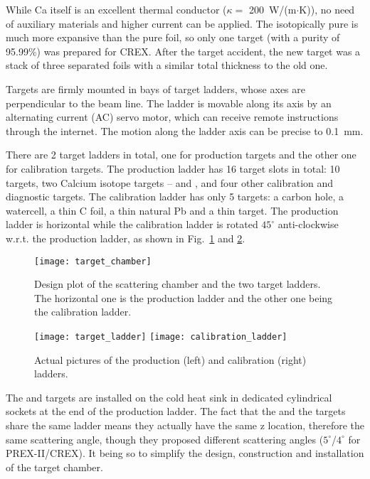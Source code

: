 While Ca itself is an excellent thermal conductor ($\kappa =$ 200~W/(m$\cdot$K)), 
no need of auxiliary materials and higher current can be applied. 
The isotopically pure \Ca is much more expansive than the pure \Pb foil, so only 
one \Ca target (with a purity of 95.99\%) was prepared for CREX.
After the target accident, 
the new \Ca target was a stack of three separated foils with a similar total thickness
to the old one.

Targets are firmly mounted in bays of target ladders, whose axes are 
perpendicular to the beam line. The ladder is movable along its axis by an 
alternating current (AC) servo motor, which can receive remote instructions 
through the internet. The motion along the ladder axis can be precise to 0.1~mm.

There are 2 target ladders in total, one for production targets and the other
one for calibration targets. The production ladder has 16 target slots in total:
10 \Pb targets, two Calcium isotope targets -- \ca and \Ca, and four other 
calibration and diagnostic targets. The calibration ladder has only 5 targets:
a carbon hole, a watercell, a thin C foil, a thin natural Pb and a thin \ca target.
The production ladder is horizontal while the calibration ladder is rotated 
$45^\circ$ anti-clockwise w.r.t. the production ladder, 
as shown in Fig.~\ref{fig:scattering_chamber} and \ref{fig:target_ladder}.

\begin{figure}[!h]
    \centering
    \texttt{[image: target\_chamber]}
    \caption[Scattering chamber]
    {Design plot of the scattering chamber and the two target ladders.
    The horizontal one is the production ladder and the other one being the 
    calibration ladder.}
    \label{fig:scattering_chamber}
\end{figure}
\begin{figure}[!h]
    \centering
    \texttt{[image: target\_ladder]}
    \texttt{[image: calibration\_ladder]}
    \caption{Actual pictures of the production (left) and calibration (right) ladders.}
    \label{fig:target_ladder}
\end{figure}

The \ca and \Ca targets are installed on the cold heat sink in dedicated cylindrical 
sockets at the end of the production ladder. %
The fact that the \Ca and the \Pb targets share the same ladder means they 
actually have the same z location, therefore the same scattering angle,
though they proposed different scattering angles ($5^\circ$/$4^\circ$ for PREX-II/CREX).
It being so to simplify the design, construction and installation of the target chamber.

